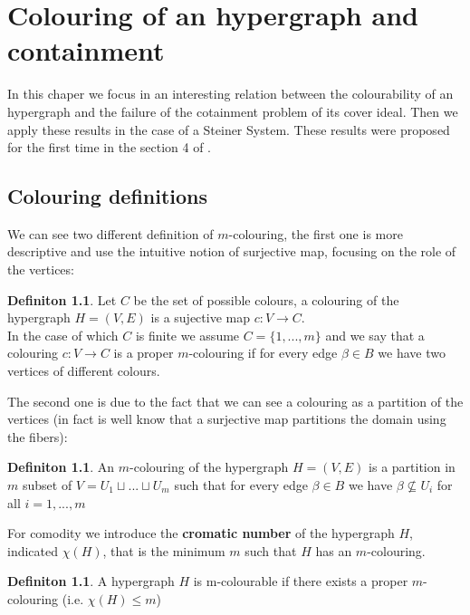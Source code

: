 \documentclass[]{book}
\theoremstyle{plain}
\theoremstyle{remark}
\theoremstyle{definition}
\newtheorem{deff}[teo]{Definiton}
\begin{document}
 

\chapter{Colouring of an hypergraph and containment}

In this chaper we focus in an interesting relation between the colourability of an hypergraph and  the failure of the cotainment problem of its cover ideal. Then we apply these results in the case of a Steiner System. These results were proposed for the first time in the section 4 of \cite{Bal21Steiner}.
 
\section{Colouring definitions}

We can see two different definition of $ m $-colouring, the first one is more descriptive and use the intuitive notion of surjective map, focusing on the role of the vertices: 
\begin{deff}\label{def:colouring1}
Let $ C $ be the set of possible colours, a colouring of the hypergraph $ H = (V,E) $ is a sujective map $ c : V \to C $. \\
In the case of which $ C $ is finite we assume $ C = \{ 1 , ... , m\} $ and we say that a colouring $ c : V \to C $ is a proper $ m $-colouring if for every edge $ \beta \in B $ we have two vertices of different colours. 
\end{deff}

The second one is due to the fact that we can see a colouring as a partition of the vertices (in fact is well know that a surjective map partitions the domain using the fibers):

\begin{deff}
An $ m $-colouring of the hypergraph $ H = (V,E) $ is a partition in $ m $ subset of $ V = U_1 \sqcup ... \sqcup U_m $ such that for every edge $ \beta \in B $ we have $ \beta \not \subseteq U_i $ for all $ i = 1, ... , m $
\end{deff}
 
For comodity we introduce the \textbf{cromatic number} of the hypergraph $ H $, indicated $ \chi(H) $, that is the minimum $ m $ such that $ H $ has an $ m $-colouring.

\begin{deff}
A hypergraph $ H $ is m-colourable if there exists a proper $ m $-colouring (i.e. $ \chi(H) \leq m $)
\end{deff}
\end{document}
